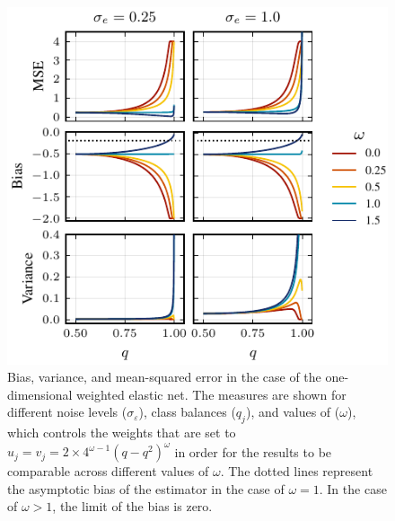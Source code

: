 \begin{figure}[htpb]
  \centering
  \includegraphics[]{plots/binary_onedim_bias_var_elnet_small.pdf}
  \caption{%
    Bias, variance, and mean-squared error in the case of the one-dimensional weighted elastic
    net. The measures are shown for different noise levels (\(\sigma_\varepsilon\)), class
    balances (\(q_j\)), and values of (\(\omega\)), which controls the weights that are set to
    \(u_j = v_j = 2\times 4^{\omega - 1}(q-q^2)^\omega\) in order for the results to be
    comparable across different values of \(\omega\). The dotted lines represent the asymptotic
    bias of the estimator in the case of \(\omega = 1\). In the case of \(\omega > 1\), the
    limit of the bias is zero. \label{fig:binary-onedim-bias-var-elnet}
  }
\end{figure}
